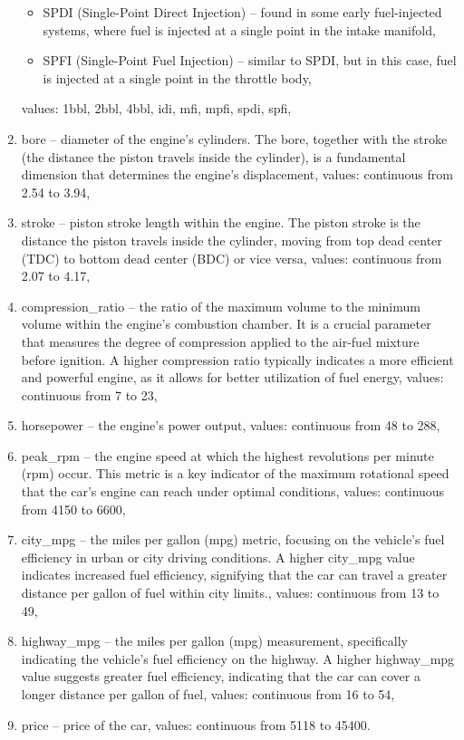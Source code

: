 \documentclass[11pt,a4paper]{article}\usepackage[]{graphicx}\usepackage[]{xcolor}
\begin{document}
\begin{enumerate}
\begin{itemize}
\item SPDI (Single-Point Direct Injection) -- found in some early fuel-injected systems, where fuel is injected at a single point in the intake manifold,

\item SPFI (Single-Point Fuel Injection) -- similar to SPDI, but in this case, fuel is injected at a single point in the throttle body,

\end{itemize} 
values: 1bbl, 2bbl, 4bbl, idi, mfi, mpfi, spdi, spfi,
 
 \item bore --  diameter of the engine's cylinders. The bore, together with the stroke (the distance the piston travels inside the cylinder), is a fundamental dimension that determines the engine's displacement, values: continuous from 2.54 to 3.94,
 
 \item stroke --  piston stroke length within the engine. The piston stroke is the distance the piston travels inside the cylinder, moving from top dead center (TDC) to bottom dead center (BDC) or vice versa, values: continuous from 2.07 to 4.17,
 
 \item compression\_ratio -- the ratio of the maximum volume to the minimum volume within the engine's combustion chamber. It is a crucial parameter that measures the degree of compression applied to the air-fuel mixture before ignition. A higher compression ratio typically indicates a more efficient and powerful engine, as it allows for better utilization of fuel energy, values: continuous from 7 to 23,
 
 \item horsepower -- the engine's power output, values: continuous from 48 to 288,
 
 \item peak\_rpm -- the engine speed at which the highest revolutions per minute (rpm) occur. This metric is a key indicator of the maximum rotational speed that the car's engine can reach under optimal conditions, values: continuous from 4150 to 6600,
 
 \item city\_mpg -- the miles per gallon (mpg) metric, focusing on the vehicle's fuel efficiency in urban or city driving conditions. A higher city\_mpg value indicates increased fuel efficiency, signifying that the car can travel a greater distance per gallon of fuel within city limits., values: continuous from 13 to 49,
 
 \item highway\_mpg -- the miles per gallon (mpg) measurement, specifically indicating the vehicle's fuel efficiency on the highway. A higher highway\_mpg value suggests greater fuel efficiency, indicating that the car can cover a longer distance per gallon of fuel, values: continuous from 16 to 54,
 
 \item price -- price of the car, values: continuous from 5118 to 45400.
	\end{enumerate}
	
\end{document}

